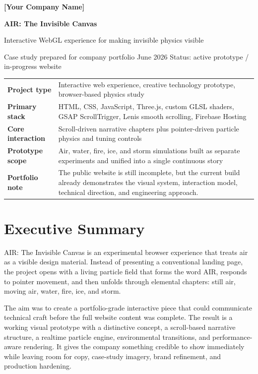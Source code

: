 \documentclass[11pt,a4paper]{article}
\newcommand{\CompanyName}{[Your Company Name]}
\newcommand{\ProjectName}{AIR: The Invisible Canvas}
\newcommand{\CaseStudyDate}{June 2026}
\newcommand{\sectionrule}{\vspace{0.2em}{\color{AirLine}\hrule height 0.8pt}\vspace{0.8em}}
\begin{document}
{\Large \textbf{\textcolor{AirBlue}{\CompanyName}}}
\vspace{0.4em}

{\Huge \textbf{\ProjectName}}

{\Large Interactive WebGL experience for making invisible physics visible}

\vspace{0.8em}
{\small \textcolor{AirMuted}{Case study prepared for company portfolio \textbullet{} \CaseStudyDate \textbullet{} Status: active prototype / in-progress website}}

\sectionrule

\begin{tabularx}{\textwidth}{>{\bfseries}p{} X}
Project type & Interactive web experience, creative technology prototype, browser-based physics study \\
Primary stack & HTML, CSS, JavaScript, Three.js, custom GLSL shaders, GSAP ScrollTrigger, Lenis smooth scrolling, Firebase Hosting \\
Core interaction & Scroll-driven narrative chapters plus pointer-driven particle physics and tuning controls \\
Prototype scope & Air, water, fire, ice, and storm simulations built as separate experiments and unified into a single continuous story \\
Portfolio note & The public website is still incomplete, but the current build already demonstrates the visual system, interaction model, technical direction, and engineering approach. \\
\end{tabularx}

\section*{Executive Summary}
\sectionrule

\ProjectName{} is an experimental browser experience that treats air as a visible design material. Instead of presenting a conventional landing page, the project opens with a living particle field that forms the word AIR, responds to pointer movement, and then unfolds through elemental chapters: still air, moving air, water, fire, ice, and storm.

The aim was to create a portfolio-grade interactive piece that could communicate technical craft before the full website content was complete. The result is a working visual prototype with a distinctive concept, a scroll-based narrative structure, a realtime particle engine, environmental transitions, and performance-aware rendering. It gives the company something credible to show immediately while leaving room for copy, case-study imagery, brand refinement, and production hardening.
\end{document}
